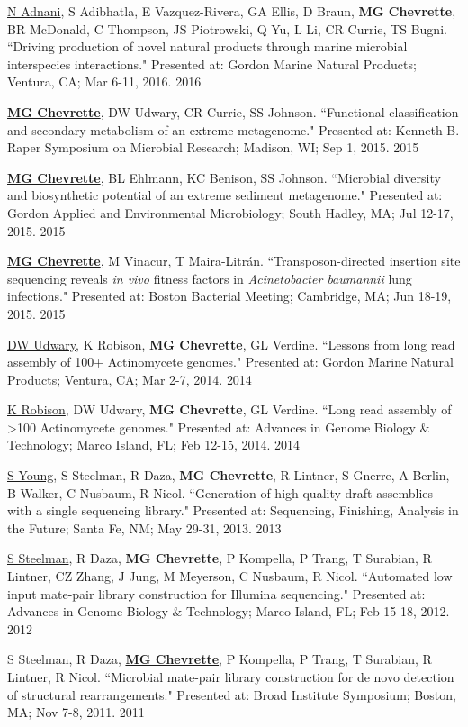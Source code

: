 \begin{cvpubs}
\cvpub
{\underline{N Adnani}, S Adibhatla, E Vazquez-Rivera, GA Ellis, D Braun, \textbf{MG Chevrette}, BR McDonald, C Thompson, JS Piotrowski, Q Yu, L Li, CR Currie, TS Bugni. ``Driving production of novel natural products through marine microbial interspecies interactions." Presented at: Gordon Marine Natural Products; Ventura, CA; Mar 6-11, 2016.}
{2016}

\cvpub
{\textbf{\underline{MG Chevrette}}, DW Udwary, CR Currie, SS Johnson. ``Functional classification and secondary metabolism of an extreme metagenome." Presented at: Kenneth B. Raper Symposium on Microbial Research; Madison, WI; Sep 1, 2015.}
{2015}

\cvpub
{\textbf{\underline{MG Chevrette}}, BL Ehlmann, KC Benison, SS Johnson. ``Microbial diversity and biosynthetic potential of an extreme sediment metagenome." Presented at: Gordon Applied and Environmental Microbiology; South Hadley, MA; Jul 12-17, 2015.}
{2015}

\cvpub
{\textbf{\underline{MG Chevrette}}, M Vinacur, T Maira-Litr\'{a}n. ``Transposon-directed insertion site sequencing reveals \textit{in vivo} fitness factors in \textit{Acinetobacter baumannii} lung infections." Presented at: Boston Bacterial Meeting; Cambridge, MA; Jun 18-19, 2015.}
{2015}

\cvpub
{\underline{DW Udwary}, K Robison, \textbf{MG Chevrette}, GL Verdine. ``Lessons from long read assembly of 100+ Actinomycete genomes." Presented at: Gordon Marine Natural Products; Ventura, CA; Mar 2-7, 2014.}
{2014}

\cvpub
{\underline{K Robison}, DW Udwary, \textbf{MG Chevrette}, GL Verdine. ``Long read assembly of >100 Actinomycete genomes." Presented at: Advances in Genome Biology \& Technology; Marco Island, FL; Feb 12-15, 2014.}
{2014}

\cvpub
{\underline{S Young}, S Steelman, R Daza, \textbf{MG Chevrette}, R Lintner, S Gnerre, A Berlin, B Walker, C Nusbaum, R Nicol. ``Generation of high-quality draft assemblies with a single sequencing library." Presented at: Sequencing, Finishing, Analysis in the Future; Santa Fe, NM; May 29-31, 2013.}
{2013}

\cvpub
{\underline{S Steelman}, R Daza, \textbf{MG Chevrette}, P Kompella, P Trang, T Surabian, R Lintner, CZ Zhang, J Jung, M Meyerson, C Nusbaum, R Nicol. ``Automated low input mate-pair library construction for Illumina sequencing." Presented at: Advances in Genome Biology \& Technology; Marco Island, FL; Feb 15-18, 2012.}
{2012}

\cvpub
{S Steelman, R Daza, \underline{\textbf{MG Chevrette}}, P Kompella, P Trang, T Surabian, R Lintner, R Nicol. ``Microbial mate-pair library construction for de novo detection of structural rearrangements." Presented at: Broad Institute Symposium; Boston, MA; Nov 7-8, 2011.}
{2011}

\end{cvpubs}